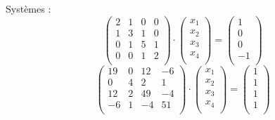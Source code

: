 \documentclass{report}
\begin{document}
	          Systèmes :
        \begin{equation}
        \begin{pmatrix}
          2 & 1 & 0 & 0 \\
          1 & 3 & 1 & 0 \\
          0 & 1 & 5 & 1 \\
          0 & 0 & 1 & 2 \\
        \end{pmatrix}
        \cdot
        \begin{pmatrix}
          x_1 \\
          x_2 \\
          x_3 \\
          x_4 \\
        \end{pmatrix}
        =
        \begin{pmatrix}
          1 \\
          0 \\
          0 \\
          -1 \\
        \end{pmatrix}
        \label{syst1} %
        \end{equation}
        \begin{equation}
        \begin{pmatrix}
          19 & 0 & 12 & -6 \\
          0 & 4 & 2 & 1 \\
          12 & 2 & 49 & -4 \\
          -6 & 1 & -4 & 51 \\
        \end{pmatrix}
        \cdot
        \begin{pmatrix}
          x_1 \\
          x_2 \\
          x_3 \\
          x_4 \\
        \end{pmatrix}
        =
        \begin{pmatrix}
          1 \\
          1 \\
          1 \\
          1 \\
        \end{pmatrix}
        \label{syst2}
        \end{equation}
\end{document}
